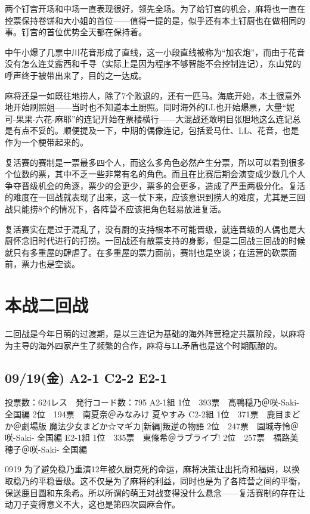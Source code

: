 两个钉宫开场和中场一直表现很好，领先全场。为了给钉宫的机会，麻将也一直在控票保持卷饼和大小姐的首位——值得一提的是，似乎还有本土钉厨也在做相同的事。钉宫的首位优势全天都在保持着。

中午小爆了几票中川花音形成了直线，这一小段直线被称为“加农炮”，而由于花音没有怎么连艾露西和千寻（实际上是因为程序不够智能不会控制连记），东山党的呼声终于被带出来了，目的之一达成。

麻将还是一如既往地捞人，除了7个败退的，还有一匹马。海底开始，本土很意外地开始刷照姐——当时也不知道本土厨照。同时海外的LL也开始爆票，大量“妮可-果果-六花-麻耶”的连记开始在票楼横行——大混战还敢明目张胆地这么连记总是有点不妥的。顺便提及一下，中期的偶像连记，包括爱马仕、LL、花音，也是作为一个梗带起来的。

复活赛的赛制是一票最多四个人，而这么多角色必然产生分票，所以可以看到很多个位数的票，其中不乏一些非常有名的角色。而且在比赛后期会演变成少数几个人争夺晋级机会的角逐，票少的会更少，票多的会更多，造成了严重两极分化。复活的难度在一回战就表现了出来，这一仗下来，应该意识到捞人的难度，尤其是三回战只能捞8个的情况下，各阵营不应该把角色轻易放进复活。

复活赛实在是过于混乱了，没有厨的支持根本不可能晋级，就连晋级的人偶也是大厨怀念旧时代进行的打捞。一回战还有散票支持的身影，但是二回战三回战的时候就只有多重屋的肆虐了。在多重屋的票力面前，赛制也是空谈；在运营的砍票面前，票力也是空谈。

\section{本战二回战}

二回战是今年日萌的过渡期，是以三连记为基础的海外阵营稳定共赢阶段，以麻将为主导的海外四家产生了频繁的合作，麻将与LL矛盾也是这个时期酝酿的。

\subsection{09/19(金) A2-1 C2-2 E2-1}

    投票数：624レス　発行コード数：795
    A2-1組
    1位　393票　高鴨穏乃＠咲-Saki- 全国編
    2位　194票　南夏奈＠みなみけ 夏やすみ
    C2-2組
    1位　371票　鹿目まどか＠劇場版 魔法少女まどか☆マギカ[新編]叛逆の物語
    2位　247票　園城寺怜＠咲-Saki- 全国編
    E2-1組
    1位　335票　東條希＠ラブライブ!
    2位　257票　福路美穂子＠咲-Saki- 全国編

0919 为了避免稳乃重演12年被久厨克死的命运，麻将决策让出托奇和福妈，以换取稳乃的平稳晋级。这不仅是为了麻将的利益，同时也是为了各阵营之间的平衡，保送鹿目圆和东条希。所以所谓的萌王对战变得没什么悬念——复活赛制的存在让动刀子变得意义不大，这也是第四次圆麻合作。

